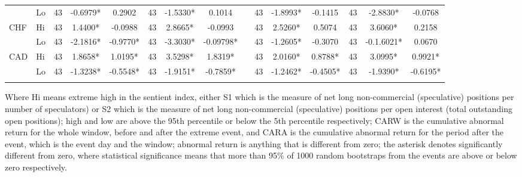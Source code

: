 \documentclass[12pt, a4paper, oneside]{article} %
\begin{document}
\begin{landscape}
\begin{table}[ht]
\begin{threeparttable}
\begin{tabular}{llccccccccccccc}
& Lo & 43 &-0.6979* &0.2902 &43 &-1.5330* &0.1014 & &43 &-1.8993* &-0.1415 &43 &-2.8830* & -0.0768 \\
\multirow{2}{*}{CHF}
& Hi & 43 & 1.4400* & -0.0988 & 43 & 2.8665* & -0.0993 & & 43 &  2.5260* &  0.5074 & 43 & 3.6060* & 0.2158  \\ 
& Lo & 43 & -2.1816* &  -0.9770* & 43 &-3.3030* & -0.09798* & & 43 & -1.2605* & -0.3070& 43 &-0.1.6021* & 0.0670  \\
\multirow{2}{*}{CAD}
& Hi & 43 & 1.8658* & 1.0195* & 43 & 3.5298* & 1.8319* & & 43 & 2.0160* & 0.8788* &43 & 3.0995* & 0.9921*  \\ 
& Lo & 43 &-1.3238* & -0.5548* & 43 & -1.9151* & -0.7859* & & 43 & -1.2462* & -0.4505*  &43 & -1.9390*  & -0.6195*  \\
\hline
\label{tabref:SP1}
\end{tabular}
\begin{tablenotes}
\small 
\item Where Hi means extreme high in the sentient index, either S1 which is the measure of net long non-commercial (speculative) positions per number of speculators) or S2 which is the measure of net long non-commercial (speculative) positions per open interest (total outstanding open positions); high and low are above the 95th percentile or below the 5th percentile respectively; CARW is the cumulative abnormal return for the whole window, before and after the extreme event, and CARA is the cumulative abnormal return for the period after the event, which is the event day and the window; abnormal return is anything that is different from zero; the asterisk denotes significantly different from zero, where statistical significance means that more than 95\% of 1000 random bootstraps from the events are above or below zero respectively.   
\end{tablenotes}	
\end{threeparttable}  
\end{table}
\end{landscape}
\end{document}
